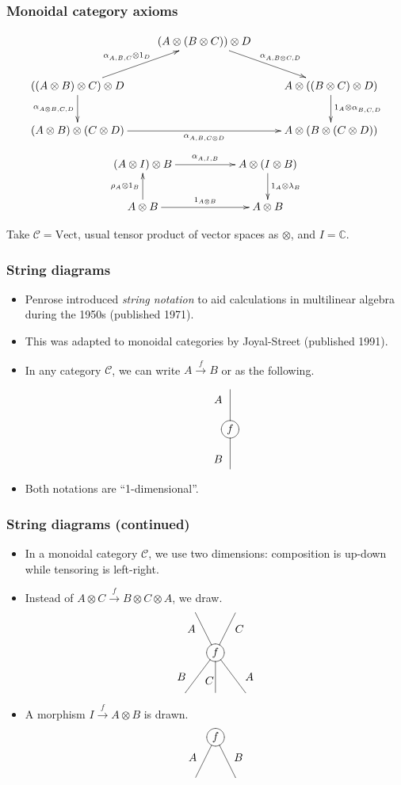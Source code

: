 \documentclass{beamer}
\newcommand{\lra}{\longrightarrow}
\def\CC{{\mathscr C}}
\begin{document}
\begin{frame}
  \frametitle{Monoidal category axioms}
\[
\xymatrix{
& (A \otimes (B \otimes C)) \otimes D \ar[rd]^-{\phantom{A}\alpha^{}_{A,B\otimes C,D}}  & \\
((A \otimes B )\otimes C) \otimes D \ar[ru]^-{\alpha^{}_{A,B,C}\otimes 1_{D}\phantom{A}} \ar[d]_-{\alpha^{}_{A\otimes B,C,D}} & & A \otimes ((B \otimes C) \otimes D ) \ar[d]^-{1_{A}\otimes\alpha^{}_{B,C,D}} \\
(A \otimes B) \otimes (C \otimes D) \ar[rr]_-{\alpha^{}_{A,B,C\otimes D }} & & A \otimes (B \otimes (C \otimes D)) 
}\] 
\[
\xymatrix{(A \otimes I)\otimes B \ar[rr]^{\alpha^{}_{A,I,B}}  
& & A \otimes (I \otimes B) \ar[d]^{1_A \otimes \lambda_B} \\
 A \otimes B \ar[rr]^{1_{A \otimes B}} \ar[u]^{\rho_A \otimes 1_B} & & A \otimes B}
\]

\begin{example} 
Take $\CC = \mathrm{Vect} $, usual tensor product of vector spaces as $\otimes$, and $I = \mathbb{C}$.
\end{example}
\end{frame}

\begin{frame}
  \frametitle{String diagrams}
\begin{itemize}
\item Penrose introduced \emph{string notation} to aid calculations in multilinear algebra during the 1950s (published 1971).
\pause
\item This was adapted to monoidal categories by Joyal-Street (published 1991).
\pause
\item In any category $\CC$, we can write $A \stackrel{f}{\lra} B$ or as the following. 

 \[ 
 \xygraph{{f} *\xycircle<8pt>{-}="m" "m"(-[u] [l(.3)d(.25)] {A},-[d] [l(.3)u(.25)] {B})}
\] 
\pause
\item Both notations are ``1-dimensional''.
\end{itemize}
\end{frame}
\begin{frame}
  \frametitle{String diagrams (continued)}
  
\begin{itemize}
\item In a monoidal category $\CC$, we use two dimensions: composition is up-down while tensoring is left-right.
\pause
\item Instead of $A \otimes C \stackrel{f}{\lra} B \otimes C \otimes A$, we draw.   
\[ 
\xygraph{{f} *\xycircle<8pt>{-}="m" "m"(-[l(.5)u] [l(.1)d(.4)] {A},-[r(.5)u] [r(.1)d(.4)] {C},-[l(.75)d] [l(.1)u(.4)] {B},-[d] [l(.15)u(.3)] {C},-[r(.75)d] [r(.1)u(.4)] {A})} 
\]
\pause
\item A morphism $I \stackrel{f}{\lra}  A \otimes B$ is drawn.
\[ 
\xygraph{!{0;(.5,0):(0,2)::}{f}*\xycircle<8pt>{-}="m" "m"(-[dl] [l(.15)u(.5)] {A},-[dr] [r(.15)u(.5)] {B})} 
\]
\end{itemize}
\end{frame}
\end{document}

